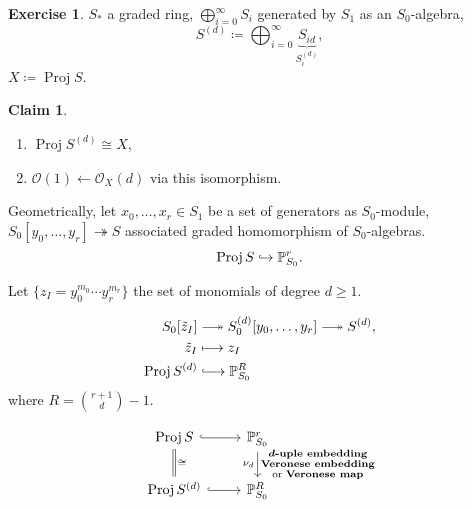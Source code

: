 \documentclass[12pt]{article}
\DeclareMathOperator{\Proj}{Proj}
\theoremstyle{definition}
\newtheorem*{claim}{Claim}
\newtheorem*{exercise}{Exercise}
\begin{document}
\begin{exercise}
$S_*$ a graded ring, $\bigoplus_{i=0}^\infty S_i$ generated by $S_1$ as an $S_0$-algebra,
\[S^{(d)}\coloneqq\bigoplus_{i=0}^\infty\underbrace{S_{id}}_{S_i^{(d)}},\]
$X\coloneqq\Proj S$.

\begin{claim}
\begin{enumerate}[label=\arabic*)]
\item $\Proj S^{(d)}\cong X$,
\item $\mathcal O(1)\leftarrow\mathcal O_X(d)$ via this isomorphism.
\end{enumerate}
\end{claim}

Geometrically, let $x_0,\ldots,x_r\in S_1$ be a set of generators as $S_0$-module, $S_0[y_0,\ldots,y_r]\twoheadrightarrow S$ associated graded homomorphism of $S_0$-algebras.
\[\Proj S\lhook\joinrel\rightarrow\mathbb P_{S_0}^r.\]

Let $\{z_I=y_0^{m_0}\cdots y_r^{m_r}\}$ the set of monomials of degree $d\geq1$.

\begin{align*}
S_0[\tilde z_I]&\relbar\joinrel\twoheadrightarrow S_0^{(d)}[y_0,\ldots,y_r]\relbar\joinrel\twoheadrightarrow S^{(d)},\\\tilde z_I&\longmapsto z_I\\\Proj S^{(d)}&\lhook\joinrel\longrightarrow\mathbb P_{S_0}^R
\end{align*}
where $R=\binom{r+1}d-1$.

\[\begin{tikzcd}\Proj S\arrow[r,hook]\arrow[d,-,double equal sign distance,double,"\cong"]&\mathbb P_{S_0}^r\arrow[d,"\substack{\boldsymbol d\text{\textbf{-uple embedding}}\\\text{\textbf{Veronese embedding}}\\\text{or \textbf{Veronese map}}}","\nu_d"']\\\Proj S^{(d)}\arrow[r,hook]&\mathbb P_{S_0}^R\end{tikzcd}\]
\end{exercise}
\end{document}
